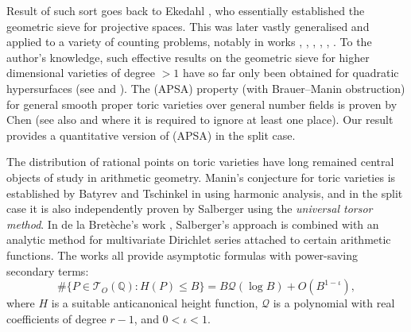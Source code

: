 \documentclass[11pt,letterpaper]{amsart}
\newcommand{\BQ}{{\mathbb {Q}}}
\newcommand{\CQ}{{\mathcal {Q}}}
\newcommand{\CT}{{\mathcal {T}}}
\theoremstyle{plain}
\numberwithin{equation}{section}
\theoremstyle{definition}
\theoremstyle{remark}
\begin{document}
Result of such sort goes back to Ekedahl \cite{Ekedahl}, who essentially established the geometric sieve for projective spaces. This was later vastly generalised and applied to a variety of counting problems, notably in works \cite[\S9]{Poonen-Stoll}, \cite[\S2.6]{Bhargava-Shankar}, \cite{Poonen}, \cite[\S3]{BBL}, \cite[\S3]{Cao-Huang2}, \cite[\S7]{Browning-HB}. To the author's knowledge, such effective results on the geometric sieve for higher dimensional varieties of degree $>1$ have so far only been obtained for quadratic hypersurfaces (see \cite[Theorem 1.6]{Cao-Huang2} and \cite[Theorems 1.1--1.3]{Browning-HB}). The (APSA) property (with Brauer--Manin obstruction) for general smooth proper toric varieties over general number fields is proven by Chen \cite[Theorem 1.7]{ChenS} (see also \cite[Theorem 1.1]{Wei} and \cite[Theorem 1.3]{Cao-Liang-Xu} where it is required to ignore at least one place). Our result provides a quantitative version of (APSA) in the split case.

The distribution of rational points on toric varieties have long remained central objects of study in arithmetic geometry. Manin's conjecture for toric varieties is established by Batyrev and Tschinkel in \cite{Bat-Tsch1,Bat-Tsch2} using harmonic analysis, and in the split case it is also independently proven by Salberger \cite{Salberger} using the \emph{universal torsor method}. In de la Bretèche's work  \cite{Breteche,Breteche2}, Salberger's approach is combined with an analytic method for multivariate Dirichlet series attached to certain arithmetic functions. The works \cite{Bat-Tsch1,Bat-Tsch2,Breteche} all provide asymptotic formulas with power-saving secondary terms: $$\#\{P\in \CT_{O}(\BQ):H(P)\leqslant B\}=B\CQ(\log B)+O(B^{1-\iota}),$$ where $H$ is a suitable anticanonical height function, $\CQ$ is a polynomial with real coefficients of degree $r-1$, and $0<\iota<1$.
\end{document}
